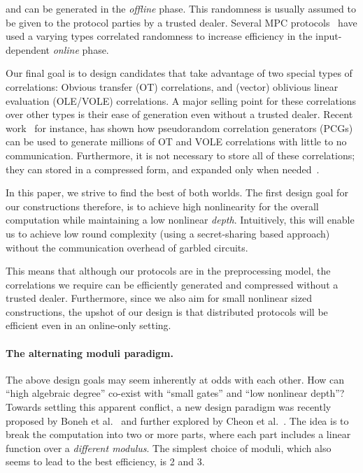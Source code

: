     and can be generated in the \textit{offline} phase. This randomness is usually assumed to be given to the protocol parties by a trusted dealer. Several MPC protocols~\cite{?} have used a varying types correlated randomness to increase efficiency in the input-dependent \textit{online} phase.

    \hspace*{1em} Our final goal is to design candidates that take advantage of two special types of correlations: Obvious transfer (OT) correlations, and (vector) oblivious linear evaluation (OLE/VOLE) correlations. A major selling point for these correlations over other types is their ease of generation even without a trusted dealer. Recent work~\cite{?} for instance, has shown how pseudorandom correlation generators (PCGs) can be used to generate millions of OT and VOLE correlations with little to no communication. Furthermore, it is not necessary to store all of these correlations; they can stored in a compressed form, and expanded only when needed~\cite{?}.


    \hspace*{1em} In this paper, we strive to find the best of both worlds. The first design goal for our constructions therefore, is to achieve high nonlinearity for the overall computation while maintaining a low nonlinear \textit{depth}. Intuitively, this will enable us to achieve low round complexity (using a secret-sharing based approach) without the communication overhead of garbled circuits.

    \hspace*{1em} This means that although our protocols are in the preprocessing model, the correlations we require can be efficiently generated and compressed without a trusted dealer. Furthermore, since we also aim for small nonlinear sized constructions, the upshot of our design is that distributed protocols will be efficient even in an online-only setting. 
\fi

\paragraph{\bf The alternating moduli paradigm.} The above design goals may seem inherently at odds with each other. How can ``high algebraic degree'' co-exist with ``small gates'' and ``low nonlinear depth''? Towards settling this apparent conflict, a new design paradigm was recently proposed by Boneh et al.~\cite{boneh2018-darkmatter} and further explored by Cheon et al.~\cite{cheon2020-adventures}. The idea is to break the computation into two or more parts, where each part includes a linear function over a {\em different modulus}. The simplest choice of moduli, which also seems to lead to the best efficiency, is 2 and 3. 

